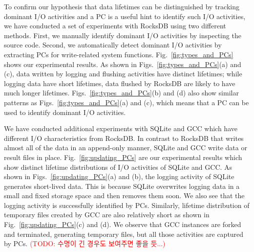 
To confirm our hypothesis that data lifetimes can be distinguished by tracking
dominant I/O activities and a PC is a useful hint to identify such I/O
activities, we have conducted a set of experiments with RocksDB using two
different methods.  First, we manually identify dominant I/O activities by
inspecting the source code.  Second, we automatically detect dominant I/O
activities by extracting PCs for write-related system functions.
Fig.~\ref{fig:types_and_PCs} shows our experimental results.  As shown in
Figs.~\ref{fig:types_and_PCs}(a) and (c), data written by logging and flushing
activities have distinct lifetimes; while logging data have short lifetimes,
data flushed by RocksDB are likely to have much longer lifetimes.
Figs.~\ref{fig:types_and_PCs}(b) and (d) also show similar patterns as
Figs.~\ref{fig:types_and_PCs}(a) and (c), which means that a PC can be used to
identify dominant I/O activities.

We have conducted additional experiments with SQLite and GCC which have
different I/O characteristics from RocksDB. In contrast to RocksDB that writes
almost all of the data in an append-only manner, SQLite and GCC write data or
result files in place. Fig.~\ref{fig:updating_PCs} are our experimental results
which show distinct lifetime distributions of I/O activities of SQLite and GCC.
As shown in Figs.~\ref{fig:updating_PCs}(a) and (b), the logging activity of
SQLite generates short-lived data.  This is because SQLite overwrites logging
data in a small and fixed storage space and then removes them soon.  We also
see that the logging activity is successfully identified by PCs. Similarly,
lifetime distribution of temporary files created by GCC are also relatively
short as shown in Fig.~\ref{fig:updating_PCs}(c) and (d). We observe that GCC
instances are forked and terminated, generating temporary files, but all those
activities are captured by PCs. \textcolor{red}{(TODO: 수명이 긴 경우도
보여주면 좋을 듯...)}


